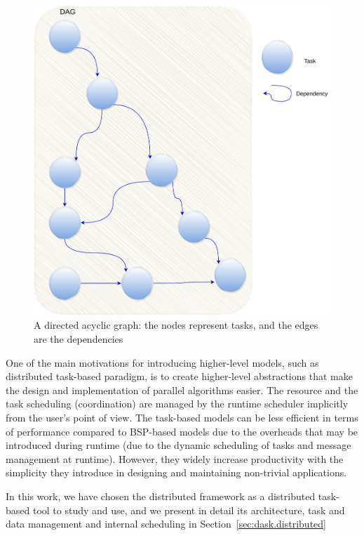 \begin{figure}[h!]\centering
\includegraphics[scale=0.5]{figures/dag.pdf}
\caption{A directed acyclic graph: the nodes represent tasks, and the edges are the dependencies}
\label{figdag}
\end{figure}

One of the main motivations for introducing higher-level models, such as distributed task-based paradigm, is to create higher-level abstractions that make the design and implementation of parallel algorithms easier. The resource and the task scheduling (coordination) are managed by the runtime scheduler implicitly from the user's point of view. 
The task-based models can be less efficient in terms of performance compared to BSP-based models due to the overheads that may be introduced during runtime (due to the dynamic scheduling of tasks and message management at runtime). However, they widely increase productivity with the simplicity they introduce in designing and maintaining non-trivial applications.   

In this work, we have chosen the \dask distributed framework as a distributed task-based tool to study and use, and we present in detail its architecture, task and data management and internal scheduling in Section~\ref{sec:dask.distributed} 


